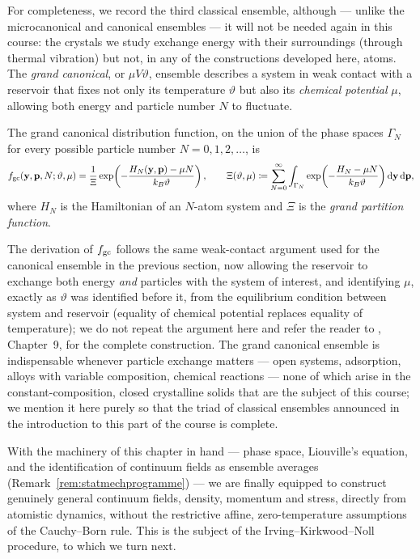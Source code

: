 For completeness, we record the third classical ensemble, although --- unlike the microcanonical and canonical ensembles --- it will not be needed again in this course: the crystals we study exchange energy with their surroundings (through thermal vibration) but not, in any of the constructions developed here, atoms. The \textit{grand canonical}, or $\mu V\vartheta$, ensemble describes a system in weak contact with a reservoir that fixes not only its temperature $\vartheta$ but also its \textit{chemical potential} $\mu$, allowing both energy and particle number $N$ to fluctuate.

\begin{definition}
	The grand canonical distribution function, on the union of the phase spaces $\Gamma_N$ for every possible particle number $N=0,1,2,\ldots$, is
	\begin{equation}
		f_{\rm gc}(\mathbf{y},\mathbf{p},N;\vartheta,\mu) = \frac1{\Xi}\exp\!\left(-\frac{H_N(\mathbf{y},\mathbf{p})-\mu N}{k_B\vartheta}\right), \qquad \Xi(\vartheta,\mu)\coloneqq\sum_{N=0}^\infty\int_{\Gamma_N} \exp\!\left(-\frac{H_N-\mu N}{k_B\vartheta}\right)\mathrm{d}\mathbf{y}\,\mathrm{d}\mathbf{p},
	\end{equation}
	where $H_N$ is the Hamiltonian of an $N$-atom system and $\Xi$ is the \textit{grand partition function}.
\end{definition}

\begin{remark}
	The derivation of $f_{\rm gc}$ follows the same weak-contact argument used for the canonical ensemble in the previous section, now allowing the reservoir to exchange both energy \textit{and} particles with the system of interest, and identifying $\mu$, exactly as $\vartheta$ was identified before it, from the equilibrium condition between system and reservoir (equality of chemical potential replaces equality of temperature); we do not repeat the argument here and refer the reader to \cite{Reif}, Chapter~9, for the complete construction. The grand canonical ensemble is indispensable whenever particle exchange matters --- open systems, adsorption, alloys with variable composition, chemical reactions --- none of which arise in the constant-composition, closed crystalline solids that are the subject of this course; we mention it here purely so that the triad of classical ensembles announced in the introduction to this part of the course is complete.
\end{remark}

\bigskip
With the machinery of this chapter in hand --- phase space, Liouville's equation, and the identification of continuum fields as ensemble averages (Remark~\ref{rem:statmechprogramme}) --- we are finally equipped to construct genuinely general continuum fields, density, momentum and stress, directly from atomistic dynamics, without the restrictive affine, zero-temperature assumptions of the Cauchy--Born rule. This is the subject of the Irving--Kirkwood--Noll procedure, to which we turn next.
